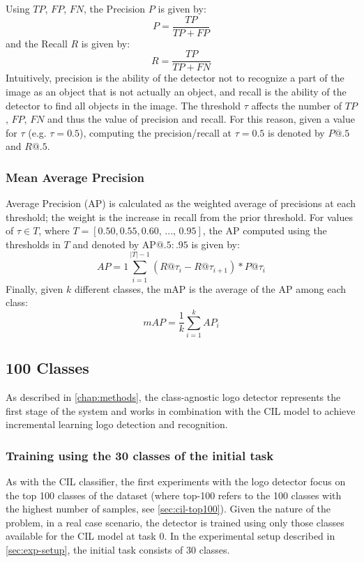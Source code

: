 Using $TP$, $FP$, $FN$, the Precision $P$ is given by:
\begin{equation} %
    P = \frac{TP}{TP + FP}
\end{equation}
and the Recall $R$ is given by:
\begin{equation} %
    R = \frac{TP}{TP + FN}
\end{equation}
Intuitively, precision is the ability of the detector not to recognize a part of the image as an object that is not actually an object, and recall is the ability of the detector to find all objects in the image.
The threshold $\tau$ affects the number of $TP$, $FP$, $FN$ and thus the value of precision and recall.
For this reason, given a value for $\tau$ (e.g. $\tau = 0.5$), computing the precision/recall at $\tau = 0.5$ is denoted by $P@.5$ and $R@.5$.

\subsubsection{Mean Average Precision}
Average Precision (AP) is calculated as the weighted average of precisions at each threshold; the weight is the increase in recall from the prior threshold. For values of $\tau \in T$, where $T = [0.50, 0.55, 0.60,\, ..., \, 0.95 ]$, the AP computed using the thresholds in $T$ and denoted by $\text{AP}@.5:.95$ is given by:
\begin{equation}
    AP = 1 \sum_{i=1}^{|T| - 1}(R@\tau_i - R@\tau_{i+1} ) * P@\tau_{i}
\end{equation}
Finally, given $k$ different classes, the mAP is the average of the AP among each class:
\begin{equation}
    mAP = \frac{1}{k} \sum_{i=1}^{k} AP_i
\end{equation}

\subsection{100 Classes}

As described in \autoref{chap:methods}, the class-agnostic logo detector represents the first stage of the system and works in combination with the CIL model to achieve incremental learning logo detection and recognition.

\subsubsection{Training using the 30 classes of the initial task}
As with the CIL classifier, the first experiments with the logo detector focus on the top 100 classes of the dataset (where top-100 refers to the 100 classes with the highest number of samples, see \autoref{sec:cil-top100}).
Given the nature of the problem, in a real case scenario, the detector is trained using only those classes available for the CIL model at task 0. In the experimental setup described in \autoref{sec:exp-setup}, the initial task consists of 30 classes.

